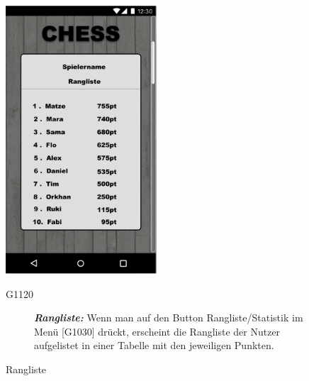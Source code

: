 \documentclass[parskip=full]{scrartcl}
\begin{document}
\begin{figure}[htp]
	\begin{minipage}[t]{6cm}
		\vspace{0pt}
		\includegraphics[height=100mm]{leaderboard.png}
		\caption{Rangliste}
		\label{fig:Rangliste}
	\end{minipage}
	\hfill
	\begin{minipage}[t]{6cm}
		\vspace{0pt}
		\begin{description}
			\item[G1120] \textbf{\textit{Rangliste: }} Wenn man auf den Button Rangliste/Statistik im Menü [G1030] drückt, erscheint die Rangliste der Nutzer aufgelistet in einer Tabelle mit den jeweiligen Punkten.
		\end{description}
	\end{minipage}


\end{figure}
\end{document}
